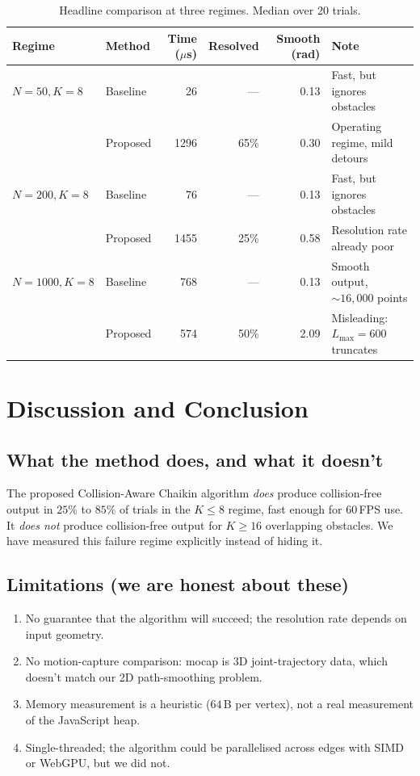 \documentclass[10pt,a4paper,twocolumn]{article}
\begin{document}
\begin{table}[t]\centering\small
\caption{Headline comparison at three regimes. Median over 20 trials.}
\label{tab:summary}
\begin{tabular}{@{}llrrrl@{}}
\toprule
Regime & Method & Time ($\mu$s) & Resolved & Smooth (rad) & Note \\
\midrule
$N{=}50,K{=}8$ & Baseline & 26  & ---  & 0.13 & Fast, but ignores obstacles \\
               & Proposed & 1296& 65\% & 0.30 & Operating regime, mild detours \\
\midrule
$N{=}200,K{=}8$& Baseline & 76  & ---  & 0.13 & Fast, but ignores obstacles \\
               & Proposed & 1455& 25\% & 0.58 & Resolution rate already poor \\
\midrule
$N{=}1000,K{=}8$&Baseline & 768 & ---  & 0.13 & Smooth output, ${\sim}16{,}000$ points \\
               & Proposed & 574 & 50\% & 2.09 & Misleading: $L_{\max}{=}600$ truncates \\
\bottomrule
\end{tabular}
\end{table}

\section{Discussion and Conclusion}

\subsection{What the method does, and what it doesn't}
The proposed Collision-Aware Chaikin algorithm \emph{does} produce
collision-free output in $25\%$ to $85\%$ of trials in the $K \leq 8$
regime, fast enough for $60$\,FPS use. It \emph{does not} produce
collision-free output for $K \geq 16$ overlapping obstacles. We have
measured this failure regime explicitly instead of hiding it.

\subsection{Limitations (we are honest about these)}
\begin{enumerate}
  \item No guarantee that the algorithm will succeed; the resolution
        rate depends on input geometry.
  \item No motion-capture comparison: mocap is 3D joint-trajectory
        data, which doesn't match our 2D path-smoothing problem.
  \item Memory measurement is a heuristic ($64$\,B per vertex), not a
        real measurement of the JavaScript heap.
  \item Single-threaded; the algorithm could be parallelised across
        edges with SIMD or WebGPU, but we did not.
\end{enumerate}
\end{document}

